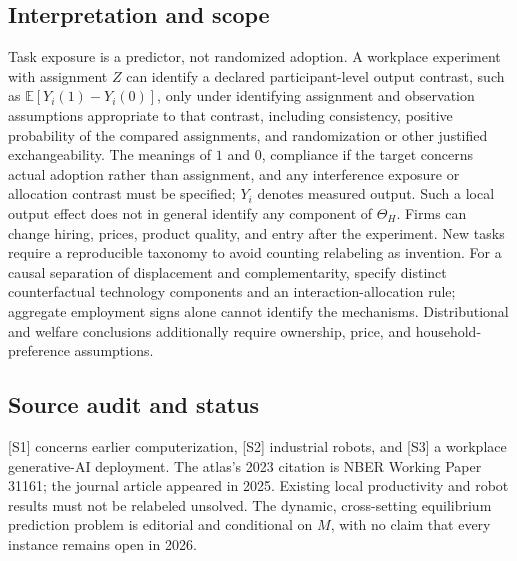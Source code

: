 \documentclass[11pt,a4paper]{article}
\begin{document}
\subsection*{Interpretation and scope}
Task exposure is a predictor, not randomized adoption. A workplace experiment with assignment $Z$ can identify a declared participant-level output contrast, such as $\mathbb E[Y_i(1)-Y_i(0)]$, only under identifying assignment and observation assumptions appropriate to that contrast, including consistency, positive probability of the compared assignments, and randomization or other justified exchangeability. The meanings of $1$ and $0$, compliance if the target concerns actual adoption rather than assignment, and any interference exposure or allocation contrast must be specified; $Y_i$ denotes measured output. Such a local output effect does not in general identify any component of $\Theta_H$. Firms can change hiring, prices, product quality, and entry after the experiment. New tasks require a reproducible taxonomy to avoid counting relabeling as invention. For a causal separation of displacement and complementarity, specify distinct counterfactual technology components and an interaction-allocation rule; aggregate employment signs alone cannot identify the mechanisms. Distributional and welfare conclusions additionally require ownership, price, and household-preference assumptions.
\subsection*{Source audit and status}
[S1] concerns earlier computerization, [S2] industrial robots, and [S3] a workplace generative-AI deployment. The atlas's 2023 citation is NBER Working Paper 31161; the journal article appeared in 2025. Existing local productivity and robot results must not be relabeled unsolved. The dynamic, cross-setting equilibrium prediction problem is editorial and conditional on $M$, with no claim that every instance remains open in 2026.
\end{document}
